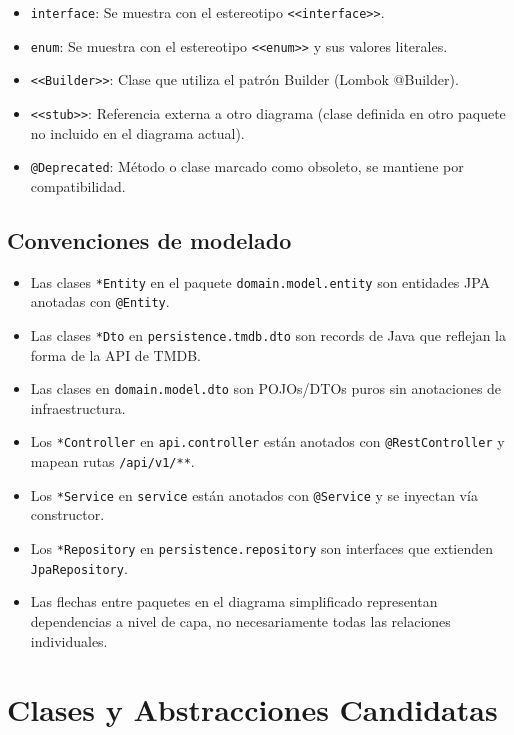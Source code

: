 \begin{itemize}
  \item \texttt{interface}: Se muestra con el estereotipo \texttt{<<interface>>}.
  \item \texttt{enum}: Se muestra con el estereotipo \texttt{<<enum>>} y sus valores literales.
  \item \texttt{<<Builder>>}: Clase que utiliza el patrón Builder (Lombok @Builder).
  \item \texttt{<<stub>>}: Referencia externa a otro diagrama (clase definida en otro paquete no incluido en el diagrama actual).
  \item \texttt{@Deprecated}: Método o clase marcado como obsoleto, se mantiene por compatibilidad.
\end{itemize}

\subsection{Convenciones de modelado}

\begin{itemize}
  \item Las clases \texttt{*Entity} en el paquete \texttt{domain.model.entity} son entidades JPA anotadas con \texttt{@Entity}.
  \item Las clases \texttt{*Dto} en \texttt{persistence.tmdb.dto} son records de Java que reflejan la forma de la API de TMDB.
  \item Las clases en \texttt{domain.model.dto} son POJOs/DTOs puros sin anotaciones de infraestructura.
  \item Los \texttt{*Controller} en \texttt{api.controller} están anotados con \texttt{@RestController} y mapean rutas \texttt{/api/v1/**}.
  \item Los \texttt{*Service} en \texttt{service} están anotados con \texttt{@Service} y se inyectan vía constructor.
  \item Los \texttt{*Repository} en \texttt{persistence.repository} son interfaces que extienden \texttt{JpaRepository}.
  \item Las flechas entre paquetes en el diagrama simplificado representan dependencias a nivel de capa, no necesariamente todas las relaciones individuales.
\end{itemize}

\section{Clases y Abstracciones Candidatas}

